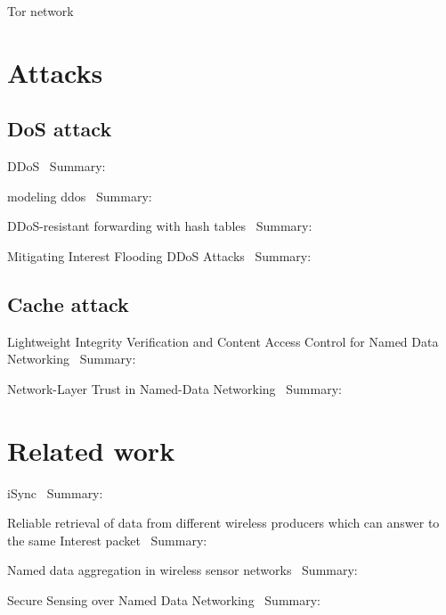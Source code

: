 Tor network

\section{Attacks}

\subsection{\gls{DoS} attack}
DDoS~\cite{DBLP:conf/icccn/GastiTU013}
Summary:


modeling ddos~\cite{DBLP:journals/ijcomsys/WangCZQZ14}
Summary:


DDoS-resistant forwarding with hash tables~\cite{DBLP:conf/ancs/SoNO13}
Summary:


Mitigating Interest Flooding DDoS Attacks~\cite{DBLP:journals/corr/abs-1303-4823}
Summary:

\subsection{Cache attack}

Lightweight Integrity Verification and Content Access Control for Named Data Networking~\cite{DBLP:journals/tifs/LiZZSF15}
Summary:


Network-Layer Trust in Named-Data Networking~\cite{DBLP:journals/ccr/GhaliTU14}
Summary:


\section{Related work}
iSync~\cite{DBLP:conf/acmicn/FuAC14}
Summary:


Reliable retrieval of data from different wireless producers which can answer to the same Interest packet~\cite{DBLP:conf/acmicn/AmadeoCM14}
Summary:


Named data aggregation in wireless sensor networks~\cite{DBLP:conf/noms/AbidySLF14}
Summary:


Secure Sensing over Named Data Networking~\cite{DBLP:conf/nca/BurkeGNT14}
Summary:

